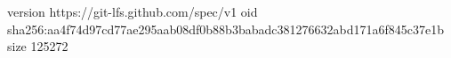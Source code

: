 version https://git-lfs.github.com/spec/v1
oid sha256:aa4f74d97cd77ae295aab08df0b88b3babadc381276632abd171a6f845c37e1b
size 125272
